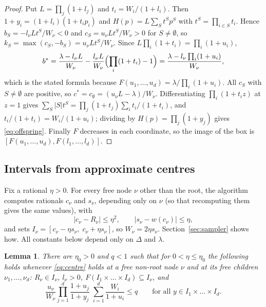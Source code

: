 \documentclass[11pt]{amsart}
\newtheorem{lemma}[theorem]{Lemma}
\begin{document}
\begin{proof}
Put $L=\prod_j(1+l_j)$ and $t_i=W_i/(1+l_i)$. Then $1+y_i=(1+l_i)(1+t_ip_i)$ and $H(p)=L\sum_St^Sp^S$ with $t^S=\prod_{i\in S}t_i$. Hence $b_S=-l_\nu Lt^S/W_\nu<0$ and $c_S=u_\nu Lt^S/W_\nu>0$ for $S\ne\emptyset$, so $k_S=\max(c_S,-b_S)=u_\nu Lt^S/W_\nu$. Since $L\prod_i(1+t_i)=\prod_i(1+u_i)$,
\[
b^*=\frac{\lambda-l_\nu L}{W_\nu}-\frac{l_\nu L}{W_\nu}\Bigl(\prod_i(1+t_i)-1\Bigr)=\frac{\lambda-l_\nu\prod_i(1+u_i)}{W_\nu},
\]
which is the stated formula because $F(u_1,\dots,u_d)=\lambda/\prod_i(1+u_i)$. All $c_S$ with $S\ne\emptyset$ are positive, so $c^*=c_\emptyset=(u_\nu L-\lambda)/W_\nu$. Differentiating $\prod_i(1+t_iz)$ at $z=1$ gives $\sum_S|S|t^S=\prod_j(1+t_j)\sum_it_i/(1+t_i)$, and $t_i/(1+t_i)=W_i/(1+u_i)$; dividing by $H(p)=\prod_j(1+y_j)$ gives \eqref{eq:offspring}. Finally $F$ decreases in each coordinate, so the image of the box is $[F(u_1,\dots,u_d),F(l_1,\dots,l_d)]$.
\end{proof}

\subsection*{Intervals from approximate centres}

Fix a rational $\eta>0$. For every free node $\nu$ other than the root, the algorithm computes rationals $c_\nu$ and $s_\nu$, depending only on $\nu$ (so that recomputing them gives the same values), with
\begin{equation}\label{eq:centre}
|c_\nu-R_\nu|\le\eta^2,\qquad |s_\nu-w(c_\nu)|\le\eta,
\end{equation}
and sets $I_\nu=[c_\nu-\eta s_\nu,\;c_\nu+\eta s_\nu]$, so $W_\nu=2\eta s_\nu$. Section~\ref{sec:sampler} shows how. All constants below depend only on $\Delta$ and $\lambda$.

\begin{lemma}\label{lem:contain}
There are $\eta_0>0$ and $q<1$ such that for $0<\eta\le\eta_0$ the following holds whenever \eqref{eq:centre} holds at a free non-root node $\nu$ and at its free children $\nu_1,\dots,\nu_d$: $R_\nu\in I_\nu$, $l_\nu>0$, $F(I_1\times\dots\times I_d)\subseteq I_\nu$, and
\[
\frac{u_\nu}{W_\nu}\prod_{j=1}^d\frac{1+u_j}{1+y_j}\;\sum_{i=1}^d\frac{W_i}{1+u_i}\le q\qquad\text{for all }y\in I_1\times\dots\times I_d .
\]
\end{lemma}
\end{document}
